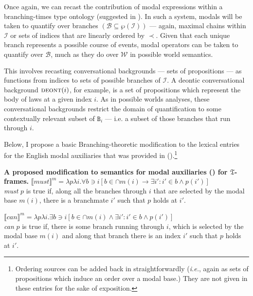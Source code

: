 \documentclass[12pt,dvipsnames]{report}
\providecommand{\denote}[2][]{\ensuremath{\llbracket{#2}\rrbracket^{#1}}}
\begin{document}
Once again, we can recast the contribution of modal expressions within a branching-times type ontology (suggested in \citealp[594, note 9]{VonPrince2019}). In such a system, modals will be taken to quantify over branches $ (\mathcal{B\subseteq\wp(I)})$ --- again, maximal chains within $ \mathcal I $ or sets of indices that are linearly ordered by $ \prec $. Given that each unique branch represents a possible course of events, modal operators can be taken to quantify over $ \mathcal B $, much as they do over $ \mathcal W $ in possible world semantics.

This involves recasting conversational backgrounds --- sets of propositions --- as functions from indices to sets of possible branches of $ \mathcal I $. A deontic conversational background $ \textsc{deont}(i) $, for example, is a set of propositions which represent the body of laws at a given index $ i $. As in possible worlds analyses, these conversational backgrounds restrict the domain of quantification to some contextually relevant subset of  $ \texttt{B}_i $ --- i.e. a subset of those branches that run through $ i $.

Below, I propose a basic Branching-theoretic modification to the  lexical entries for the English modal auxiliaries that was provided in ().\footnote{Ordering sources can be added back in straightforwardly (\textit{i.e.}, again as sets of propositions which induce an order over a modal base.) They are not given in these entries for the sake of exposition.}

\pex[exno=\getref{K-modals}′⁣] \textbf{A proposed modification to semantics for modal auxiliaries () for $ \mathfrak T $-frames.}
\a$ \denote[m]{\textit{must}}=\lambda p\lambda i.\forall b\ni i[b\in\cap m(i)\to \exists i':i'\in b\wedge p(i')] $\\
\textit{must} $ p $ is true if, along all the branches through $ i $ that are selected by the modal base $ m(i) $, there is a branchmate $ i' $ such that $ p $ holds at $ i' $.

\a$ \denote[m]{\textit{can}}=\lambda p\lambda i.\exists b\ni i[b\in\cap m(i)\wedge \exists i':i'\in b\wedge p(i')] $\\
\textit{ can } $ p $ is true if, there is some branch running through $ i $, which is selected by the modal base $ m(i) $ and along that branch there is an index $ i' $ such that $ p $ holds at $ i' $.
\end{document}

